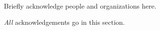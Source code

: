 \documentclass{uai2023} %
\begin{document}
\begin{acknowledgements} %
    Briefly acknowledge people and organizations here.

    \emph{All} acknowledgements go in this section.
\end{acknowledgements}


\end{document}
